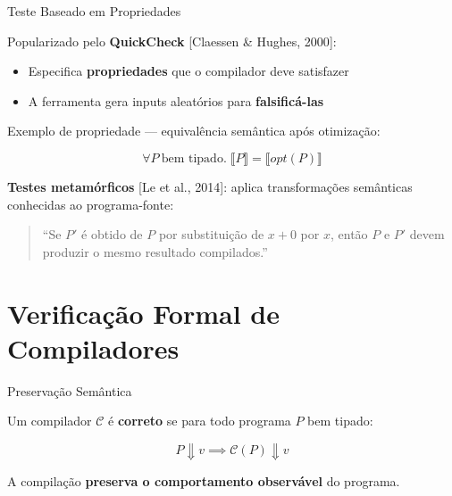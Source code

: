 \begin{frame}{Teste Baseado em Propriedades}

    Popularizado pelo \textbf{QuickCheck} {[}Claessen \& Hughes, 2000{]}:

    \begin{itemize}

        \item
        Especifica \textbf{propriedades} que o compilador deve satisfazer
        \item
        A ferramenta gera inputs aleatórios para \textbf{falsificá-las}
    \end{itemize}

    Exemplo de propriedade --- equivalência semântica após otimização:

    \[\forall P\ \text{bem tipado}.\; \llbracket P \rrbracket = \llbracket \mathit{opt}(P) \rrbracket\]

    \textbf{Testes metamórficos} {[}Le et al., 2014{]}: aplica
    transformações semânticas conhecidas ao programa-fonte:

    \begin{quote}
        ``Se \(P'\) é obtido de \(P\) por substituição de \(x + 0\) por \(x\),
        então \(P\) e \(P'\) devem produzir o mesmo resultado compilados.''
    \end{quote}
\end{frame}


\section{Verificação Formal de
Compiladores}\label{verificauxe7uxe3o-formal-de-compiladores}

\begin{frame}{Preservação Semântica}

    Um compilador \(\mathcal{C}\) é \textbf{correto} se para todo programa
    \(P\) bem tipado:

    \[P \Downarrow v \implies \mathcal{C}(P) \Downarrow v\]

    A compilação \textbf{preserva o comportamento observável} do programa.
\end{frame}

